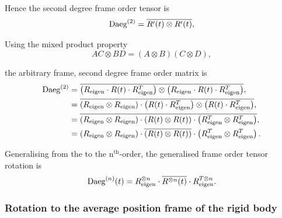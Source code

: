 Hence the second degree frame order tensor is
\begin{equation}
    \textrm{Daeg}^{(2)} = \overline{R'(t) \otimes R'(t)} ,
\end{equation}

Using the mixed product property
\begin{equation}
    AC \otimes BD = (A \otimes B)(C \otimes D) ,
\end{equation}

the arbitrary frame, second degree frame order matrix is
\begin{subequations}
\begin{align}
    \textrm{Daeg}^{(2)} &= \overline{\left( R_{\textrm{eigen}} \cdot R(t) \cdot R_{\textrm{eigen}}^T \right) \otimes \left( R_{\textrm{eigen}} \cdot R(t) \cdot R_{\textrm{eigen}}^T \right)} , \\
           &= \overline{\left(R_{\textrm{eigen}} \otimes R_{\textrm{eigen}} \right) \cdot \left( R(t) \cdot R_{\textrm{eigen}}^T \right) \otimes \left( R(t) \cdot R_{\textrm{eigen}}^T \right)} , \\
           &= \overline{\left(R_{\textrm{eigen}} \otimes R_{\textrm{eigen}} \right) \cdot \left( R(t) \otimes R(t) \right) \cdot \left( R_{\textrm{eigen}}^T \otimes R_{\textrm{eigen}}^T \right)} , \\
           &= \left(R_{\textrm{eigen}} \otimes R_{\textrm{eigen}} \right) \cdot \overline{\left( R(t) \otimes R(t) \right)} \cdot \left( R_{\textrm{eigen}}^T \otimes R_{\textrm{eigen}}^T \right) .
\end{align}
\end{subequations}

Generalising from the  to the n$^{\textrm{th}}$-order, the generalised frame order tensor rotation is
\begin{equation} \label{eq: frame order equation, arbitrary frame}
    \textrm{Daeg}^{(n)}(t) = R_{\textrm{eigen}}^{\otimes n} \cdot \overline{R^{\otimes n}(t)} \cdot R_{\textrm{eigen}}^{T \otimes n} .
\end{equation}





\subsubsection{Rotation to the average position frame of the rigid body}

